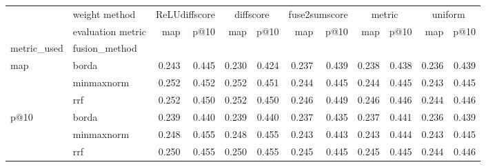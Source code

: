 \begin{tabular}{llrrrrrrrrrr}
\toprule
 & weight method & \multicolumn{2}{c}{ReLUdiffscore} & \multicolumn{2}{c}{diffscore} & \multicolumn{2}{c}{fuse2sumscore} & \multicolumn{2}{c}{metric} & \multicolumn{2}{c}{uniform} \\
 & evaluation metric & map & p@10 & map & p@10 & map & p@10 & map & p@10 & map & p@10 \\
metric_used & fusion_method &  &  &  &  &  &  &  &  &  &  \\
\midrule
\multirow[t]{3}{*}{map} & borda & 0.243 & 0.445 & 0.230 & 0.424 & 0.237 & 0.439 & 0.238 & 0.438 & 0.236 & 0.439 \\
 & minmaxnorm & 0.252 & 0.452 & 0.252 & 0.451 & 0.244 & 0.445 & 0.244 & 0.445 & 0.243 & 0.445 \\
 & rrf & 0.252 & 0.450 & 0.252 & 0.450 & 0.246 & 0.449 & 0.246 & 0.446 & 0.244 & 0.446 \\
\cline{1-12}
\multirow[t]{3}{*}{p@10} & borda & 0.239 & 0.440 & 0.239 & 0.440 & 0.237 & 0.435 & 0.237 & 0.441 & 0.236 & 0.439 \\
 & minmaxnorm & 0.248 & 0.455 & 0.248 & 0.455 & 0.243 & 0.443 & 0.243 & 0.444 & 0.243 & 0.445 \\
 & rrf & 0.250 & 0.455 & 0.250 & 0.455 & 0.245 & 0.445 & 0.245 & 0.445 & 0.244 & 0.446 \\
\cline{1-12}
\bottomrule
\end{tabular}
